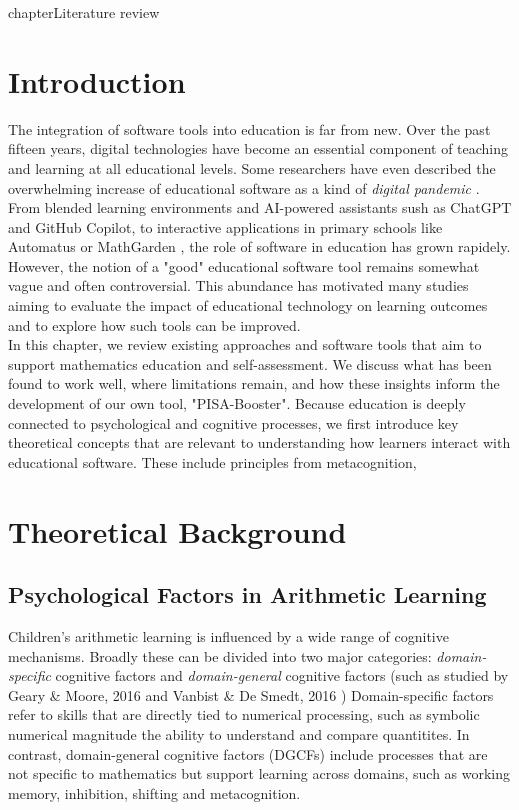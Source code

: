  chapter{Literature review}


\section{Introduction}
The integration of software tools into education is far from new. Over the past fifteen years, digital technologies have become an essential component of teaching and learning at all educational levels.
Some researchers have even described the overwhelming increase of educational software as a kind of \textit{digital pandemic} \cite{dancsa_digital_2023}.
From blended learning environments and AI-powered assistants sush as ChatGPT and GitHub Copilot, to interactive applications in primary schools like Automatus \cite{automatus} or MathGarden \cite{rekentuin}, the role of software in education has grown rapidely. \\

However, the notion of a "good" educational software tool remains somewhat vague and often controversial. 
This abundance has motivated many studies aiming to evaluate the impact of educational technology on learning outcomes and to explore how such tools can be improved. \\

In this chapter, we review existing approaches and software tools that aim to support mathematics education and self-assessment. 
We discuss what has been found to work well, where limitations remain, and how these insights inform the development of our own tool, "PISA-Booster". 
Because education is deeply connected to psychological and cognitive processes, we first introduce key theoretical concepts that are relevant to understanding how learners interact with educational software.
These include principles from metacognition, 

\section{Theoretical Background}
\subsection{Psychological Factors in Arithmetic Learning}
Children's arithmetic learning is influenced by a wide range of cognitive mechanisms.
Broadly these can be divided into two major categories: \textit{domain-specific} cognitive factors and \textit{domain-general} cognitive factors (such as studied by Geary \& Moore, 2016 \cite{geary_chapter_2016} and Vanbist \& De Smedt, 2016 \cite{vanbinst_chapter_2016})
Domain-specific factors refer to skills that are directly tied to numerical processing, such as symbolic numerical magnitude  the ability to understand and compare quantitites. 
In contrast, domain-general cognitive factors (DGCFs) include processes that are not specific to mathematics but support learning across domains, such as working memory, inhibition, shifting and metacognition. \\

